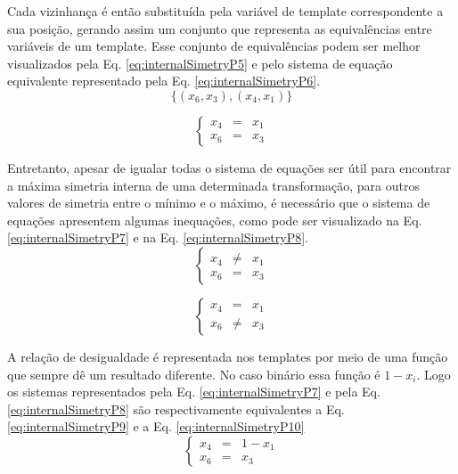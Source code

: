 Cada vizinhança é então substituída pela variável de template correspondente a sua posição, gerando assim um conjunto que representa as equivalências entre variáveis de um template. Esse conjunto de equivalências podem ser melhor visualizados pela Eq. \eqref{eq:internalSimetryP5} e pelo sistema de equação equivalente representado pela Eq. \eqref{eq:internalSimetryP6}.
\begin{equation}
\{(x_6,x_3), (x_4,x_1)\}
\label{eq:internalSimetryP5}
\end{equation}

\begin{equation}
\left\{\begin{matrix}
x_4 & = & x_1\\ 
x_6 & = & x_3
\end{matrix}\right.
\label{eq:internalSimetryP6}
\end{equation}

Entretanto, apesar de igualar todas o sistema de equações ser útil para encontrar a máxima simetria interna de uma determinada transformação, para outros valores de simetria entre o mínimo e o máximo, é necessário que o sistema de equações apresentem algumas inequações, como pode ser visualizado na Eq. \eqref{eq:internalSimetryP7} e na Eq. \eqref{eq:internalSimetryP8}.
\begin{equation}
\left\{\begin{matrix}
x_4 & \neq & x_1\\ 
x_6 & = & x_3
\end{matrix}\right.
\label{eq:internalSimetryP7}
\end{equation}

\begin{equation}
\left\{\begin{matrix}
x_4 & = & x_1\\ 
x_6 & \neq & x_3
\end{matrix}\right.
\label{eq:internalSimetryP8}
\end{equation}

A relação de desigualdade é representada nos templates por meio de uma função que sempre dê um resultado diferente. No caso binário essa função é $1 - x_i$. Logo os sistemas representados pela Eq. \eqref{eq:internalSimetryP7} e pela Eq. \eqref{eq:internalSimetryP8} são respectivamente equivalentes a Eq. \eqref{eq:internalSimetryP9} e a Eq. \eqref{eq:internalSimetryP10}
\begin{equation}
\left\{\begin{matrix}
x_4 & = & 1 - x_1\\ 
x_6 & = & x_3
\end{matrix}\right.
\label{eq:internalSimetryP9}
\end{equation}

